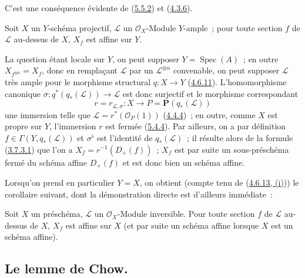 C'est une conséquence évidente de (\hyperref[II.5.5.2-fr]{5.5.2}) et
(\hyperref[II.4.3.6-fr]{4.3.6}).

\begin{proposition}[5.5.7]
\label{II.5.5.7-fr}
Soit $X$ un $Y$-schéma projectif, $\mathcal{L}$ un $\mathcal{O}_X$-Module
$Y$-ample~; pour toute section $f$ de $\mathcal{L}$ au-dessus de $X$, $X_f$
est affine sur $Y$.
\end{proposition}


La question étant locale sur $Y$, on peut supposer
$Y=\operatorname{Spec}(A)$~; en outre
$X_{f^{\otimes n}}=X_f$, donc en remplaçant $\mathcal{L}$ par un
$\mathcal{L}^{\otimes n}$ convenable, on peut supposer $\mathcal{L}$ très
ample pour le morphisme structural $q:X\to Y$
(\hyperref[II.4.6.11-fr]{4.6.11}). L'homomorphisme canonique
$\sigma:q^*(q_*(\mathcal{L}))\to\mathcal{L}$ est donc surjectif et le
morphisme correspondant
\[
r=r_{\mathcal{L},\sigma}:X\to P=\mathbf{P}(q_*(\mathcal{L}))
\]
une immersion telle que $\mathcal{L}=r^*(\mathcal{O}_P(1))$
(\hyperref[II.4.4.4-fr]{4.4.4})~; en outre, comme $X$ est propre sur $Y$,
l'immersion $r$ est fermée (\hyperref[II.5.4.4-fr]{5.4.4}). Par ailleurs, on
a par définition $f\in\Gamma(Y,q_*(\mathcal{L}))$ et $\sigma^\flat$ est
l'identité de $q_*(\mathcal{L})$~; il résulte alors de la formule
(\hyperref[II.3.7.3.1-fr]{3.7.3.1}) que l'on a $X_f=r^{-1}(D_+(f))$~; $X_f$
est par suite un sous-préschéma fermé du schéma affine $D_+(f)$ et est donc
bien un schéma affine.

Lorsqu'on prend en particulier $Y=X$, on obtient (compte tenu de
(\hyperref[II.4.6.13-fr]{4.6.13, (i)})) le corollaire suivant, dont la
démonstration directe est d'ailleurs immédiate~:

\begin{corollary}[5.5.8]
\label{II.5.5.8-fr}
Soit $X$ un préschéma, $\mathcal{L}$ un $\mathcal{O}_X$-Module inversible.
Pour toute section $f$ de $\mathcal{L}$ au-dessus de $X$, $X_f$ est affine
sur $X$ (et par suite un schéma affine lorsque $X$ est un schéma affine).
\end{corollary}

\subsection{Le lemme de Chow.}
\label{subsection:II.5.6-fr}

